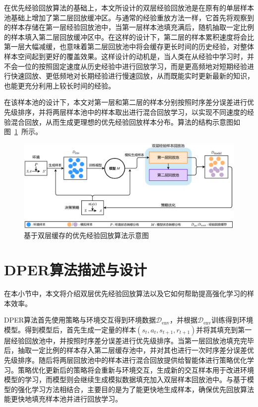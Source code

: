在优先经验回放算法的基础上，本文所设计的双层经验回放池是在原有的单层样本池基础上增加了第二层回放缓冲区。与通常的经验重放方法一样，它首先将观察到的样本存储在第一层经验回放池中，当第一层样本池填充满后，随机抽取一定比例的样本填入第二层回放缓冲区中。在这样的设计下，第二层的样本累积速度将会比第一层大幅减缓，也意味着第二层回放池中将会缓存更长时间的历史经验，对整体样本空间起到更好的覆盖效果。这样设计的动机是，当人类在从经验中学习时，并不会一位的按照固定速度从历史经验中进行回放学习，而是更高频地对短期经验进行快速回放、更低频地对长期经验进行慢速回放，从而既能实时更新最新的知识，也能更充分利用上较长时间的经验。

在该样本池的设计下，本文对第一层和第二层的样本分别按照时序差分误差进行优先级排序，并将两层样本池中的样本取出进行混合回放学习，以实现不同速度的经验混合回放，从而生成更理想的优先经验回放样本分布。算法的结构示意图如图~\ref{fig:algo-structure}~所示。

\begin{figure}[ht]
\centering
\includegraphics[width=\textwidth]{figures/dber.pdf}
\caption{基于双层缓存的优先经验回放算法示意图}
\label{fig:algo-structure}
\end{figure}

\section{DPER算法描述与设计}

在本小节中，本文将介绍双层优先经验回放算法以及它如何帮助提高强化学习的样本效率。

DPER算法首先使用策略与环境交互得到环境数据$\mathcal{D}_{\text{env}}$，并根据$\mathcal{D}_{\text{env}}$训练得到环境模型。得到模型后，首先生成一定量的样本$(s_t, a_t, s_{t+1}, r_{t+1})$并将其填充到第一层经验回放池中，并按照时序差分误差进行优先级排序。当第一层回放池填充完毕后，抽取一定比例的样本存入第二层缓存池中，并对其也进行一次时序差分误差优先级排序。随后将两层回放池中的样本进行混合回放提供给智能体进行策略优化学习。策略优化更新后的策略将会重新与环境交互，生成新的交互样本用于改进环境模型的学习，而模型则会继续生成模拟数据填充加入双层样本回放池中。与基于模型的强化学习方法相结合，主要目的是为了能更快地生成样本，确保优先回放算法能更快地填充样本池并进行回放学习。

